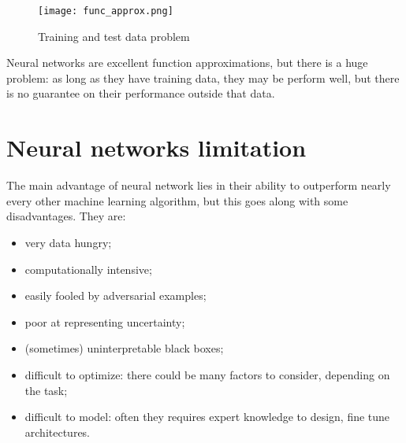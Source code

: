 \begin{figure}[H]
  \centering
  \texttt{[image: func\_approx.png]}
  \caption{Training and test data problem}
  \label{fig:hist_ex}
\end{figure}

Neural networks are excellent function approximations, but there is a huge
problem: as long as they have training data, they may be perform well, but
there is no guarantee on their performance outside that data.

\section{Neural networks limitation}

The main advantage of neural network lies in their ability to outperform nearly every other machine learning algorithm, but this goes along with some disadvantages. They are:

\begin{itemize}
 \item very data hungry;
 \item computationally intensive;
 \item easily fooled by adversarial examples;
 \item poor at representing uncertainty;
 \item (sometimes) uninterpretable black boxes;
 \item difficult to optimize: there could be many factors to consider, depending on the task;
 \item difficult to model: often they requires expert knowledge to design, fine tune architectures.
\end{itemize}
